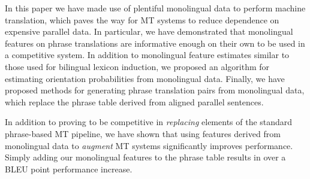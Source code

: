 \documentclass[11pt]{article}
\newcommand{\secref}[1]{Section~\ref{#1}}
\begin{document}
In this paper we have made use of plentiful monolingual data to perform machine translation, which paves the way for MT systems to reduce dependence on expensive parallel data.  In particular, we have demonstrated that monolingual features on phrase translations are informative enough on their own to be used in a competitive system. In addition to monolingual feature estimates similar to those used for bilingual lexicon induction, we proposed an algorithm for estimating orientation probabilities from monolingual data. Finally, we have proposed methods for generating phrase translation pairs from monolingual data, which replace the phrase table derived from aligned parallel sentences.

In addition to proving to be competitive in {\it replacing} elements of the standard phrase-based MT pipeline, we have shown that using features derived from monolingual data to {\it augment} MT systems significantly improves performance. Simply adding our monolingual features to the phrase table results in over a BLEU point performance increase.






\end{document}
